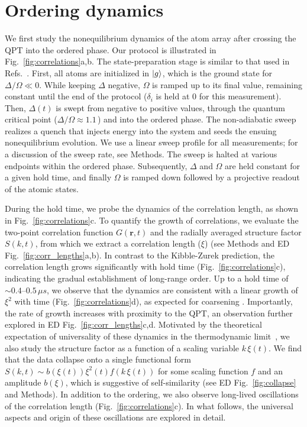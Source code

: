 \documentclass[reprint,twocolumn,secnumarabic,amssymb, aps, prx]{revtex4-2}
\begin{document}
\section*{Ordering dynamics}
\label{sec:ordering}

We first study the nonequilibrium dynamics of the atom array after crossing the QPT into the ordered phase. Our protocol is illustrated in Fig.~\ref{fig:correlations}a,b. The state-preparation stage is similar to that used in Refs.~\cite{ebadi2021quantum, semeghini2021probing}. First, all atoms are initialized in $\ket{g}$, which is the ground state for $\Delta/\Omega\ll 0$. While keeping $\Delta$ negative, $\Omega$ is ramped up to its final value, remaining constant until the end of the protocol ($\delta_i$ is held at 0 for this measurement).  Then, $\Delta(t)$ is swept from negative to positive values, through the quantum critical point ($\Delta/\Omega \approx 1.1\,$\cite{ebadi2021quantum}) and into the ordered phase. The non-adiabatic sweep realizes a quench that injects energy into the system and seeds the ensuing nonequilibrium evolution. We use a linear sweep profile for all measurements; for a discussion of the sweep rate, see Methods. The sweep is halted at various endpoints within the ordered phase.  Subsequently, $\Delta$ and $\Omega$ are held constant for a given hold time, and finally $\Omega$ is ramped down followed by a projective readout of the atomic states. 


During the hold time, we probe the dynamics of the correlation length, as shown in Fig.~\ref{fig:correlations}c.  
To quantify the growth of correlations, we evaluate the two-point correlation function $G(\textbf{r},t)$ and the radially averaged structure factor $S(k,t)$, from which we extract a correlation length ($\xi$) (see Methods and ED Fig.~\ref{fig:corr_lengths}a,b).
In contrast to the Kibble-Zurek prediction, the correlation length grows significantly with hold time (Fig.~\ref{fig:correlations}c), indicating the gradual establishment of long-range order. 
Up to a hold time of $\sim 0.4$--$0.5$\,$\mu s$,  we  observe that the dynamics are consistent with a linear growth of $\xi^2$ with time (Fig.~\ref{fig:correlations}d), as expected for coarsening \cite{Bray1994, Samajdar2024}. Importantly,  the rate of growth increases with proximity to the QPT, an observation further explored in ED Fig.~\ref{fig:corr_lengths}c,d.
Motivated by the theoretical expectation of universality of these dynamics in the thermodynamic limit~\cite{Bray1994,barenblatt1996scaling,gazo2023universal}, we also
study the structure factor
as a function of a scaling variable $k \,\xi(t)$. We find that the data collapse onto a single functional form  $S (k,t) \sim b(\xi(t))\xi^2 (t) f (k \,\xi(t))$ for some scaling function $f$ and an amplitude $b(\xi)$, which is suggestive of  self-similarity
(see ED Fig.~\ref{fig:collapse} and Methods). 
In addition to the ordering, we also observe long-lived oscillations of the correlation length (Fig.~\ref{fig:correlations}c). In what follows, the universal aspects and origin of these oscillations are explored in detail. 
\end{document}
